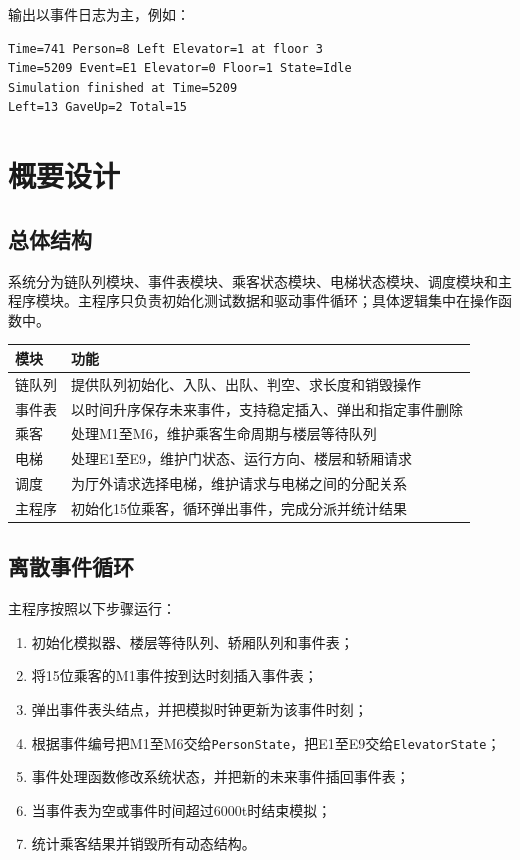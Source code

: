 \documentclass[UTF8,a4paper,12pt]{ctexart}
\begin{document}
输出以事件日志为主，例如：

\begin{lstlisting}[language={},numbers=none]
Time=741 Person=8 Left Elevator=1 at floor 3
Time=5209 Event=E1 Elevator=0 Floor=1 State=Idle
Simulation finished at Time=5209
Left=13 GaveUp=2 Total=15
\end{lstlisting}

\section{概要设计}

\subsection{总体结构}

系统分为链队列模块、事件表模块、乘客状态模块、电梯状态模块、调度模块和主程序模块。主程序只负责初始化测试数据和驱动事件循环；具体逻辑集中在操作函数中。

\begin{center}
\begin{tabular}{p{3.5cm}p{10cm}}
\toprule
模块 & 功能\\
\midrule
链队列 & 提供队列初始化、入队、出队、判空、求长度和销毁操作\\
事件表 & 以时间升序保存未来事件，支持稳定插入、弹出和指定事件删除\\
乘客 & 处理M1至M6，维护乘客生命周期与楼层等待队列\\
电梯 & 处理E1至E9，维护门状态、运行方向、楼层和轿厢请求\\
调度 & 为厅外请求选择电梯，维护请求与电梯之间的分配关系\\
主程序 & 初始化15位乘客，循环弹出事件，完成分派并统计结果\\
\bottomrule
\end{tabular}
\end{center}

\subsection{离散事件循环}

主程序按照以下步骤运行：

\begin{enumerate}[label=\arabic*.]
    \item 初始化模拟器、楼层等待队列、轿厢队列和事件表；
    \item 将15位乘客的M1事件按到达时刻插入事件表；
    \item 弹出事件表头结点，并把模拟时钟更新为该事件时刻；
    \item 根据事件编号把M1至M6交给\texttt{PersonState}，把E1至E9交给\texttt{ElevatorState}；
    \item 事件处理函数修改系统状态，并把新的未来事件插回事件表；
    \item 当事件表为空或事件时间超过6000t时结束模拟；
    \item 统计乘客结果并销毁所有动态结构。
\end{enumerate}
\end{document}
